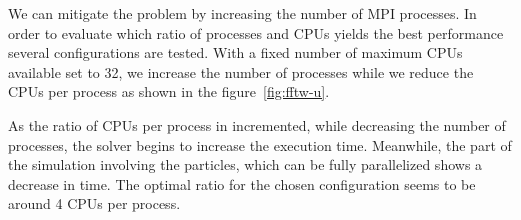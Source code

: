 We can mitigate the problem by increasing the number of MPI processes. In order 
to evaluate which ratio of processes and CPUs yields the best performance 
several configurations are tested. With a fixed number of maximum CPUs available 
set to 32, we increase the number of processes while we reduce the CPUs per 
process as shown in the figure~\ref{fig:fftw-u}.

As the ratio of CPUs per process in incremented, while decreasing the number of 
processes, the solver begins to increase the execution time. Meanwhile, the part 
of the simulation involving the particles, which can be fully parallelized shows 
a decrease in time. The optimal ratio for the chosen configuration seems to be 
around 4 CPUs per process.


